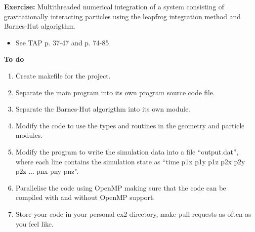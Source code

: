 
\subtitle{Course exercise 2\\ multithreaded dynamical simulation using Barnes-Hut and OpenMP}



\begin{frame}
  \titlepage
\end{frame}


\begin{frame}
  \textbf{Exercise:} Multithreaded numerical integration of a system consisting of gravitationally interacting particles using the leapfrog integration method and Barnes-Hut algorigthm.
  \begin{itemize}
   \item See TAP p. 37-47 and p. 74-85
  \end{itemize}


  \textbf{To do}
  \begin{enumerate}
   \item Create makefile for the project.
   \item Separate the main program into its own program source code file.
   \item Separate the Barnes-Hut algorigthm into its own module.
   \item Modify the code to use the types and routines in the geometry and particle modules.
   \item Modify the program to write the simulation data into a file “output.dat”, where each line contains the simulation state as ``time p1x p1y p1z p2x p2y p2z ... pnx pny pnz''.
   \item Parallelise the code using OpenMP making sure that the code can be compiled with and without OpenMP support.
   \item Store your code in your personal ex2 directory, make pull requests as often as you feel like.
  \end{enumerate}
\end{frame}


